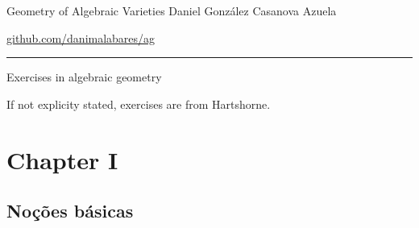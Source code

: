 



\begin{minipage}{\textwidth}
	\begin{minipage}{1\textwidth}
		Geometry of Algebraic Varieties \hfill Daniel González Casanova Azuela
		
		{\small\hfill\href{https://github.com/danimalabares/ag}{github.com/danimalabares/ag}}
	\end{minipage}
\end{minipage}\vspace{.2cm}\hrule

\vspace{10pt}

{\Huge Exercises in algebraic geometry}

If not explicity stated, exercises are from Hartshorne.

\tableofcontents

\section{Chapter I}

\subsection{No\c c\~oes b\'asicas}

